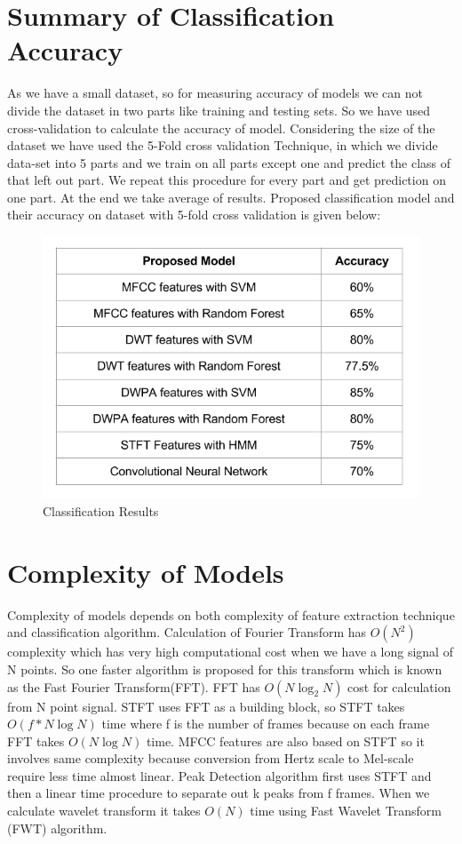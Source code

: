 \documentclass[11pt]{report}
\begin{document}
\section{Summary of Classification Accuracy}
As we have a small dataset, so for measuring accuracy of models  we can not divide the dataset in two parts like training and testing sets. So we have used cross-validation to calculate the accuracy of model. Considering the size of the dataset we have used the 5-Fold cross validation Technique, in which we divide data-set into 5 parts and we train on all parts except one and predict the class of that left out part. We repeat this procedure for every part and get prediction on one part. At the end we take average of results. Proposed classification model and their accuracy on dataset with 5-fold  cross validation is given below:  

\begin{figure}[ht]
\centering
\includegraphics[scale=0.7]{./images/results.png}
\caption{Classification Results}
\end{figure}

\section{Complexity of Models}
Complexity of models depends on both complexity of feature extraction technique and classification algorithm.
Calculation of Fourier Transform has $O(N^2)$ complexity  which has very high computational cost when we have a long signal of N points. So one faster algorithm is proposed for this transform which is known as the Fast Fourier Transform(FFT). FFT has $O(N\log_{2}N)$ cost for calculation from N point signal. STFT  uses FFT as a building block, so  STFT takes $O(f* N \log{N})$ time where f is the number of frames because on each frame FFT takes $O(N \log{N})$  time. MFCC features are also based on  STFT so it involves same complexity because conversion from Hertz scale to Mel-scale require less time almost linear. Peak Detection algorithm first uses STFT and then a linear time procedure to separate out k peaks from f frames. When we calculate wavelet transform it takes $O(N)$ time using Fast Wavelet Transform (FWT) algorithm.\\
\end{document}
